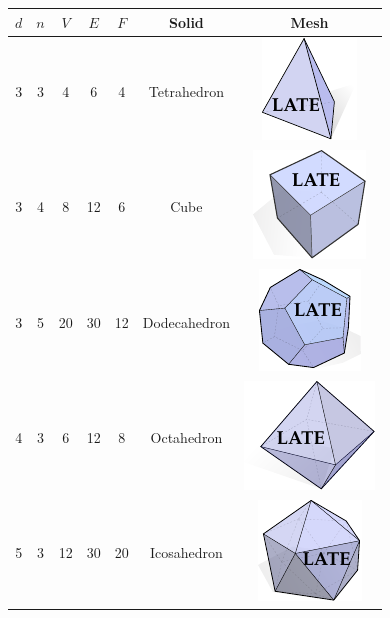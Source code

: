 \documentclass{article}
\begin{document}
\begin{center}
    \begin{tabular}{ |c|c|c|c|c|c|c| } 
        \hline
        $d$ & $n$ & $V$ & $E$ & $F$ & Solid & Mesh \\ 
        \hline
        \hline
        3 & 3 & 4 & 6 & 4 & Tetrahedron & \includegraphics{figs/LatonicSolids/LateTetrahedron.pdf}\\ 
        \hline
        3 & 4 & 8 & 12 & 6 & Cube & \includegraphics{figs/LatonicSolids/LateCube.pdf}\\ 
        \hline 
        3 & 5 & 20 & 30 & 12 & Dodecahedron & \includegraphics{figs/LatonicSolids/LateDodecahedron.pdf}\\ 
        \hline 
        4 & 3 & 6 & 12 & 8 & Octahedron & \includegraphics{figs/LatonicSolids/LateOctahedron.pdf}\\ 
        \hline 
        5 & 3 & 12 & 30 & 20 & Icosahedron & \includegraphics{figs/LatonicSolids/LateIcosahedron.pdf}\\ 
        \hline
\end{tabular}
\end{center}
\end{document}
